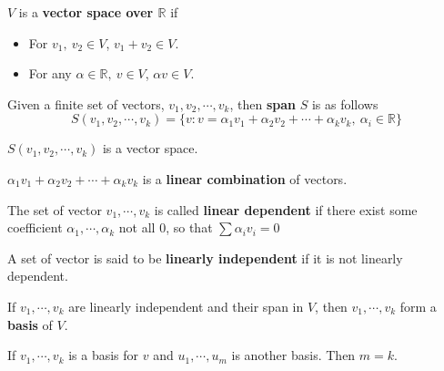 \begin{definition}
	$V$ is a \textbf{vector space over $\mathbb{R}$} if
	\begin{itemize}
		\item For $v_1, ~v_2 \in V$, $v_1 + v_2 \in V$.
		\item For any $\alpha \in \mathbb{R}, ~v \in V$, $\alpha v \in V$.
	\end{itemize}
\end{definition}

\begin{definition}
    Given a finite set of vectors, $v_1, v_2, \cdots, v_k$, then \textbf{span} 
$S$ is as 
    follows
    \[S(v_1, v_2, \cdots, v_k) = \{v: v = \alpha_1 v_1 + \alpha_2 v_2 + \cdots 
    +\alpha_k v_k, ~\alpha_i \in \mathbb{R}\}\]
\end{definition}
$S(v_1, v_2, \cdots, v_k)$ is a vector space.

\begin{definition}
	$\alpha_1 v_1 + \alpha_2 v_2 + \cdots +\alpha_k v_k$ is a \textbf{linear 
combination} of vectors. 
\end{definition}

\begin{definition}
    The set of vector $v_1, \cdots, v_k$ is called \textbf{linear dependent} if 
there exist some coefficient $\alpha_1, \cdots, \alpha_k$ not all $0$, so that 
$\sum \alpha_i v_i = 0$
\end{definition}

\begin{definition}
	A set of vector is said to be \textbf{linearly independent} if it is not 
linearly dependent.
\end{definition}

\begin{definition}
	If $v_1, \cdots, v_k$ are linearly independent and their span in $V$, then 
$v_1, \cdots, v_k$ form a \textbf{basis} of $V$.
\end{definition}

\begin{definition}
	If $v_1, \cdots, v_k$ is a basis for $v$ and $u_1, \cdots, u_m$ is another 
basis. Then $m = k$.
\end{definition}

